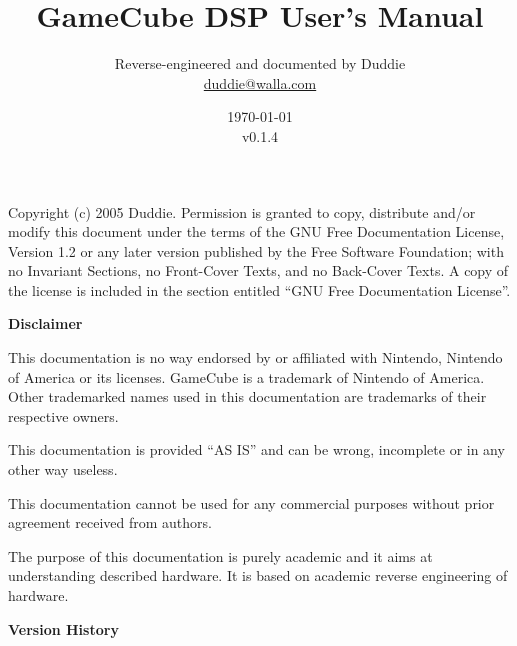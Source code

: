 \documentclass[oneside,english,a4paper,10pt,oneside,openany,final]{memoir}
\title{\textbf{\Huge GameCube DSP User's Manual}}
\author{Reverse-engineered and documented by Duddie \\ \href{mailto:duddie@walla.com}{duddie@walla.com}}
\date{\today\\v0.1.4}
\begin{document}
\maketitle{}

\pagebreak{}
\vspace*{\fill}

Copyright (c) 2005 Duddie. Permission is granted to copy, distribute and/or modify this document under the terms of the GNU Free Documentation License, Version 1.2 or any later version published by the Free Software Foundation; with no Invariant Sections, no Front-Cover Texts, and no Back-Cover Texts. A copy of the license is included in the section entitled ``GNU Free Documentation License''.

\pagebreak{}
\tableofcontents{}
\pagebreak{}

\textbf{\LARGE Disclaimer}
\vspace{5mm}

This documentation is no way endorsed by or affiliated with Nintendo, Nintendo of America or its licenses. GameCube is a trademark of Nintendo of America. Other trademarked names used in this documentation are trademarks of their respective owners.

This documentation is provided ``AS IS'' and can be wrong, incomplete or in any other way useless.

This documentation cannot be used for any commercial purposes without prior agreement received from authors.

The purpose of this documentation is purely academic and it aims at understanding described hardware. It is based on academic reverse engineering of hardware.

\pagebreak{}
\textbf{\LARGE Version History}
\vspace{5mm}
\end{document}
